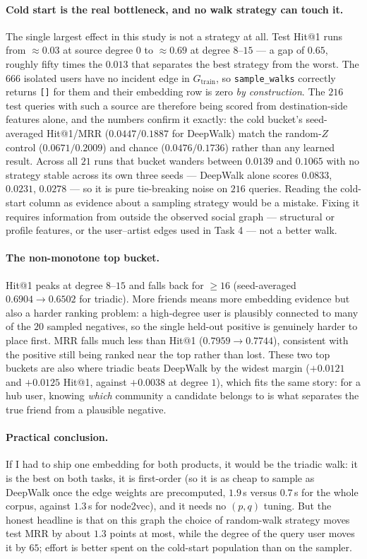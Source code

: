 \paragraph{Cold start is the real bottleneck, and no walk strategy can touch it.}
The single largest effect in this study is not a strategy at all.  Test Hit@1 runs from
$\approx 0.03$ at source degree $0$ to $\approx 0.69$ at degree $8$--$15$ --- a gap of
$0.65$, roughly fifty times the $0.013$ that separates the best strategy from the worst.
The $666$ isolated users have no incident edge in $G_{\mathrm{train}}$, so
\texttt{sample\_walks} correctly returns \texttt{[]} for them and their embedding row is
zero \emph{by construction}.  The $216$ test queries with such a source are therefore
being scored from destination-side features alone, and the numbers confirm it exactly:
the cold bucket's seed-averaged Hit@1/MRR ($0.0447/0.1887$ for DeepWalk) match the
random-$Z$ control ($0.0671/0.2009$) and chance ($0.0476/0.1736$) rather than any learned
result.  Across all $21$ runs that bucket wanders between $0.0139$ and $0.1065$ with no
strategy stable across its own three seeds --- DeepWalk alone scores $0.0833$, $0.0231$,
$0.0278$ --- so it is pure tie-breaking noise on $216$ queries.  Reading the cold-start
column as evidence about a sampling strategy would be a mistake.  Fixing it
requires information from outside the observed social graph --- structural or profile
features, or the user--artist edges used in Task 4 --- not a better walk.

\paragraph{The non-monotone top bucket.}
Hit@1 peaks at degree $8$--$15$ and falls back for $\ge 16$ (seed-averaged
$0.6904 \to 0.6502$ for triadic).  More friends means more embedding evidence but also a
harder ranking problem: a high-degree user is plausibly connected to many of the $20$
sampled negatives, so the single held-out positive is genuinely harder to place first.
MRR falls much less than Hit@1 ($0.7959\to0.7744$), consistent with the positive still
being ranked near the top rather than lost.  These two top buckets are also where triadic
beats DeepWalk by the widest margin ($+0.0121$ and $+0.0125$ Hit@1, against $+0.0038$ at
degree $1$), which fits the same story: for a hub user, knowing \emph{which} community a
candidate belongs to is what separates the true friend from a plausible negative.

\paragraph{Practical conclusion.}
If I had to ship one embedding for both products, it would be the triadic walk: it is the
best on both tasks, it is first-order (so it is as cheap to sample as DeepWalk once the
edge weights are precomputed, $1.9$\,s versus $0.7$\,s for the whole corpus, against
$1.3$\,s for node2vec), and it needs no $(p,q)$ tuning.  But the honest headline is that
on this graph the choice of random-walk strategy moves test MRR by about $1.3$ points at
most, while the degree of the query user moves it by $65$; effort is better spent on the
cold-start population than on the sampler.
